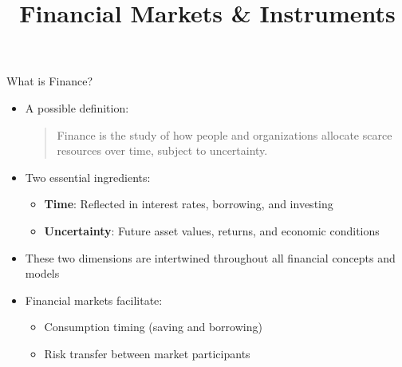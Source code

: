 \documentclass[10pt,handout]{beamer}
\title{Financial Markets \& Instruments}
\author{}
\date{}
\begin{document}
\begin{frame}
\titlepage
\end{frame}

\begin{frame}{What is Finance?}
  \begin{itemize}[<+->]
    \item A possible definition:
    \begin{quote}
      Finance is the study of how people and organizations allocate scarce resources over time, subject to uncertainty.
    \end{quote}
    \item Two essential ingredients:
      \begin{itemize}
        \item \textbf{Time}: Reflected in interest rates, borrowing, and investing
        \item \textbf{Uncertainty}: Future asset values, returns, and economic conditions
      \end{itemize}
    \item These two dimensions are intertwined throughout all financial concepts and models
    \item Financial markets facilitate:
      \begin{itemize}
        \item Consumption timing (saving and borrowing)
        \item Risk transfer between market participants
      \end{itemize}
  \end{itemize}
\end{frame}
\end{document}

